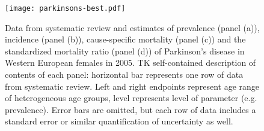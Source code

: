     \begin{figure}[h]
        \begin{center}
            \texttt{[image: parkinsons-best.pdf]}
            \caption{Data from systematic review and estimates of prevalence (panel (a)), incidence (panel (b)), cause-specific mortality (panel (c)) and the standardized mortality ratio (panel (d)) of Parkinson's disease in Western European females in 2005. TK self-contained description of contents of each panel: horizontal bar represents one row of data from systematic review.  Left and right endpoints represent age range of heterogeneous age groups, level represents level of parameter (e.g. prevalence).  Error bars are omitted, but each row of data includes a standard error or similar quantification of uncertainty as well.}
            \label{fig:intro-parkinsons fit}
        \end{center}
    \end{figure}
